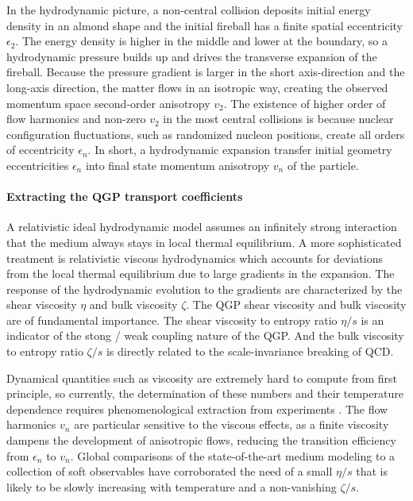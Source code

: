 In the hydrodynamic picture, a non-central collision deposits initial energy density in an almond shape and the initial fireball has a finite spatial eccentricity $\epsilon_2$.
The energy density is higher in the middle and lower at the boundary, so a hydrodynamic pressure builds up and drives the transverse expansion of the fireball.
Because the pressure gradient is larger in the short axis-direction and the long-axis direction, the matter flows in an isotropic way, creating the observed momentum space second-order anisotropy $v_2$.
The existence of higher order of flow harmonics and non-zero $v_2$ in the most central collisions is because nuclear configuration fluctuations, such as randomized nucleon positions, create all orders of eccentricity $\epsilon_n$.
In short, a hydrodynamic expansion transfer initial geometry eccentricities $\epsilon_n$ into final state momentum anisotropy $v_n$ of the particle.

\paragraph{Extracting the QGP transport coefficients}
A relativistic ideal hydrodynamic model assumes an infinitely strong interaction that the medium always stays in local thermal equilibrium.
A more sophisticated treatment is relativistic viscous hydrodynamics which accounts for deviations from the local thermal equilibrium due to large gradients in the expansion.
The response of the hydrodynamic evolution to the gradients are characterized by the shear viscosity $\eta$ and bulk viscosity $\zeta$.
The QGP shear viscosity and bulk viscosity are of fundamental importance. 
The shear viscosity to entropy ratio $\eta/s$ is an indicator of the stong / weak coupling nature of the QGP. 
And the bulk viscosity to entropy ratio $\zeta/s$ is directly related to  the scale-invariance breaking of QCD.

Dynamical quantities such as viscosity are extremely hard to compute from first principle, so currently, the determination of these numbers and their temperature dependence requires phenomenological extraction from experiments \cite{Muronga:2004sf, Chaudhuri:2006jd, Romatschke:2007mq, Dusling:2007gi, Song:2007ux, Luzum:2008cw}.
The flow harmonics $v_n$ are particular sensitive to the viscous effects, as a finite viscosity dampens the development of anisotropic flows, reducing the transition efficiency from $\epsilon_n$ to $v_n$.
Global comparisons of the state-of-the-art medium modeling to a collection of soft observables have corroborated the need of a small $\eta/s$ that is likely to be slowly increasing with temperature and a non-vanishing $\zeta/s$.

